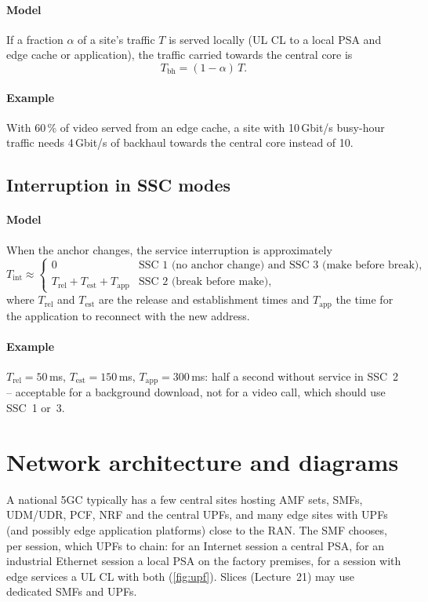 \documentclass[11pt,a4paper]{article}
\begin{document}
\paragraph{Model} If a fraction $\alpha$ of a site's traffic $T$ is served locally (UL CL to a local PSA and edge cache or
application), the traffic carried towards the central core is
\begin{equation}\label{eq:offload}
  T_{\mathrm{bh}} = (1-\alpha)\,T .
\end{equation}
\paragraph{Example} With 60\,\% of video served from an edge cache, a site with 10\,Gbit/s busy-hour traffic needs 4\,Gbit/s of
backhaul towards the central core instead of 10.

\subsection{Interruption in SSC modes}\label{sec:ssc}
\paragraph{Model} When the anchor changes, the service interruption is approximately
\begin{equation}\label{eq:ssc}
  T_{\mathrm{int}} \approx
  \begin{cases}
    0 & \text{SSC 1 (no anchor change) and SSC 3 (make before break)},\\
    T_{\mathrm{rel}} + T_{\mathrm{est}} + T_{\mathrm{app}} & \text{SSC 2 (break before make)},
  \end{cases}
\end{equation}
where $T_{\mathrm{rel}}$ and $T_{\mathrm{est}}$ are the release and establishment times and $T_{\mathrm{app}}$ the time for the
application to reconnect with the new address.
\paragraph{Example} $T_{\mathrm{rel}} = 50$\,ms, $T_{\mathrm{est}} = 150$\,ms, $T_{\mathrm{app}} = 300$\,ms: half a second without
service in SSC~2 -- acceptable for a background download, not for a video call, which should use SSC~1 or~3.

\section{Network architecture and diagrams}
A national 5GC typically has a few central sites hosting AMF sets, SMFs, UDM/UDR, PCF, NRF and the central UPFs, and many edge
sites with UPFs (and possibly edge application platforms) close to the RAN. The SMF chooses, per session, which UPFs to chain:
for an Internet session a central PSA, for an industrial Ethernet session a local PSA on the factory premises, for a session
with edge services a UL CL with both (\cref{fig:upf}). Slices (Lecture~21) may use dedicated SMFs and UPFs.
\end{document}
